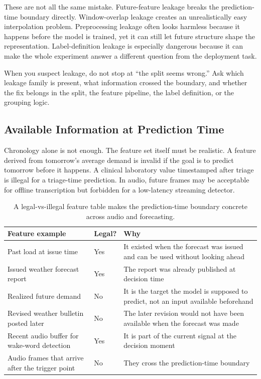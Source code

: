 These are not all the same mistake. Future-feature leakage breaks the prediction-time boundary directly. Window-overlap leakage creates an unrealistically easy interpolation problem. Preprocessing leakage often looks harmless because it happens before the model is trained, yet it can still let future structure shape the representation. Label-definition leakage is especially dangerous because it can make the whole experiment answer a different question from the deployment task.

\begin{decisionbox}
When you suspect leakage, do not stop at ``the split seems wrong.'' Ask which leakage family is present, what information crossed the boundary, and whether the fix belongs in the split, the feature pipeline, the label definition, or the grouping logic.
\end{decisionbox}

\subsection{Available Information at Prediction Time}

Chronology alone is not enough. The feature set itself must be realistic. A feature derived from tomorrow's average demand is invalid if the goal is to predict tomorrow before it happens. A clinical laboratory value timestamped after triage is illegal for a triage-time prediction. In audio, future frames may be acceptable for offline transcription but forbidden for a low-latency streaming detector.

\begin{table}[t]
\centering
\small
\setlength{\tabcolsep}{4pt}
\begin{tabular}{L{2.61cm}L{1.35cm}L{5.99cm}}
\toprule
Feature example & Legal? & Why \\
\midrule
Past load at issue time & Yes & It existed when the forecast was issued and can be used without looking ahead \\
Issued weather forecast report & Yes & The report was already published at decision time \\
Realized future demand & No & It is the target the model is supposed to predict, not an input available beforehand \\
Revised weather bulletin posted later & No & The later revision would not have been available when the forecast was made \\
Recent audio buffer for wake-word detection & Yes & It is part of the current signal at the decision moment \\
Audio frames that arrive after the trigger point & No & They cross the prediction-time boundary \\
\bottomrule
\end{tabular}
\caption{A legal-vs-illegal feature table makes the prediction-time boundary concrete across audio and forecasting.}
\label{tab:legal-vs-illegal-features}
\end{table}

